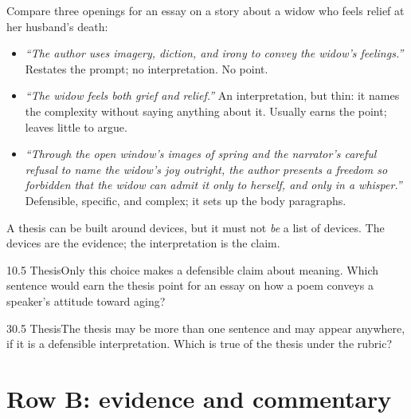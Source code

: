 \documentclass[11pt]{article}
\begin{document}
Compare three openings for an essay on a story about a widow who feels relief at her husband's death:
\begin{itemize}
\item \emph{``The author uses imagery, diction, and irony to convey the widow's feelings.''} Restates the prompt; no interpretation. No point.
\item \emph{``The widow feels both grief and relief.''} An interpretation, but thin: it names the complexity without saying anything about it. Usually earns the point; leaves little to argue.
\item \emph{``Through the open window's images of spring and the narrator's careful refusal to name the widow's joy outright, the author presents a freedom so forbidden that the widow can admit it only to herself, and only in a whisper.''} Defensible, specific, and complex; it sets up the body paragraphs.
\end{itemize}

\begin{trap}
A thesis can be built around devices, but it must not \emph{be} a list of devices. The devices are the evidence; the interpretation is the claim.
\end{trap}

\begin{q}{1}{0.5 Thesis}{Only this choice makes a defensible claim about meaning.}
Which sentence would earn the thesis point for an essay on how a poem conveys a speaker's attitude toward aging?
\end{q}

\begin{q}{3}{0.5 Thesis}{The thesis may be more than one sentence and may appear anywhere, if it is a defensible interpretation.}
Which is true of the thesis under the rubric?
\end{q}

\section{Row B: evidence and commentary}
\label{sec:6}
\end{document}
